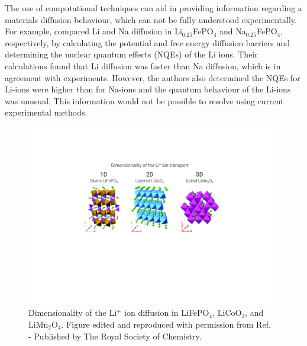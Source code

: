 \documentclass[../main.tex]{subfiles}
\begin{document}
The use of computational techniques can aid in providing information regarding a materials diffusion behaviour, which can not be fully understood experimentally. For example, \citeauthor{dixit2015classical} compared Li and Na diffusion in Li$_{0.25}$FePO$_4$ and Na$_{0.25}$FePO$_4$, respectively, by calculating the potential and free energy diffusion barriers and determining the nuclear quantum effects (NQEs) of the Li ions. \cite{dixit2015classical} Their calculations found that Li diffusion was faster than Na diffusion, which is in agreement with experiments. However, the authors also determined the NQEs for Li-ions were higher than for Na-ions and the quantum behaviour of the Li-ions was unusual. This information would not be possible to resolve using current experimental methods.

\begin{figure}
    \centering
    \includegraphics[scale=0.8]{figures/cathode_diffusion_pathways.pdf}
    \caption{Dimensionality of the Li$^+$ ion diffusion in LiFePO$_4$, LiCoO$_2$, and LiMn$_2$O$_4$. Figure edited and reproduced with permission from Ref.~ - Published by The Royal Society of Chemistry.}
    \label{fig:cathode_diffusion_pathways}
\end{figure}
\end{document}
